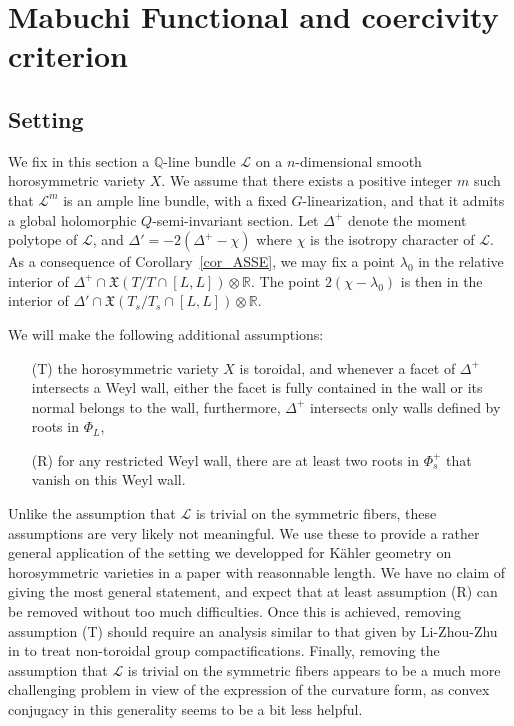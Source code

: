 \documentclass{amsart}
\theoremstyle{definition}
\begin{document}
\section{Mabuchi Functional and coercivity criterion}
\label{sec_mabuchi}

\subsection{Setting}

We fix in this section a $\mathbb{Q}$-line bundle $\mathcal{L}$ on a 
$n$-dimensional smooth horosymmetric variety $X$. We assume that there 
exists a positive integer $m$ such that $\mathcal{L}^m$ is an ample 
line bundle, with a fixed $G$-linearization, and that it admits a 
global holomorphic $Q$-semi-invariant section. Let $\Delta^+$ 
denote the moment polytope of $\mathcal{L}$, and 
$\Delta'=-2(\Delta^+-\chi)$ where $\chi$ is the isotropy character 
of $\mathcal{L}$. 
As a consequence of Corollary~\ref{cor_ASSE}, we may fix a point $\lambda_0$ 
in the relative interior of $\Delta^+\cap \mathfrak{X}(T/T\cap [L,L])\otimes \mathbb{R}$. 
The point $2(\chi-\lambda_0)$ is then in the interior of  
$\Delta'\cap \mathfrak{X}(T_s/T_s\cap [L,L])\otimes \mathbb{R}$. 

We will make the following additional assumptions:
\begin{itemize}
\item[(T)] the horosymmetric variety $X$ is toroidal, and 
whenever a facet of $\Delta^+$ intersects a Weyl 
wall, either the facet is fully contained in the wall or its 
normal belongs to the wall, furthermore, $\Delta^+$ intersects 
only walls defined by roots in $\Phi_L$,
\item[(R)] for any restricted Weyl wall, there are at least 
two roots in $\Phi^+_s$ that vanish on this Weyl wall.
\end{itemize}

Unlike the assumption that $\mathcal{L}$ is trivial on the symmetric 
fibers, these assumptions are very likely not meaningful. We use these 
to provide a rather general application of the setting we developped 
for Kähler geometry on horosymmetric varieties in a paper with reasonnable 
length. We have no claim of giving the most general statement, and 
expect that at least assumption (R) can be removed 
without too much difficulties. 
Once this is achieved, removing assumption (T) should require an analysis similar to that 
given by Li-Zhou-Zhu in \cite{LZZ} to treat non-toroidal group 
compactifications. 
Finally, removing the assumption that $\mathcal{L}$ is trivial on the symmetric 
fibers appears to be a much more challenging problem in view of the 
expression of the curvature form, as convex 
conjugacy in this generality seems to be a bit less helpful.
\end{document}

